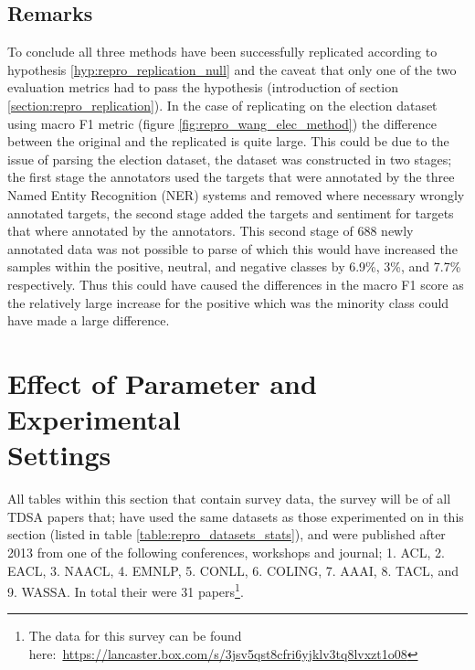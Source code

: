\subsection{Remarks}
To conclude all three methods have been successfully replicated according to hypothesis \ref{hyp:repro_replication_null} and the caveat that only one of the two evaluation metrics had to pass the hypothesis (introduction of section \ref{section:repro_replication}). In the case of replicating \citet{repro_wang_2017} on the election dataset using macro F1 metric (figure \ref{fig:repro_wang_elec_method}) the difference between the original and the replicated is quite large. This could be due to the issue of parsing the election dataset, the dataset was constructed in two stages; the first stage the annotators used the targets that were annotated by the three Named Entity Recognition (NER) systems and removed where necessary wrongly annotated targets, the second stage added the targets and sentiment for targets that where annotated by the annotators. This second stage of 688 newly annotated data was not possible to parse of which this would have increased the samples within the positive, neutral, and negative classes by 6.9\%, 3\%, and 7.7\% respectively. Thus this could have caused the differences in the macro F1 score as the relatively large increase for the positive which was the minority class could have made a large difference.



\section{Effect of Parameter and Experimental \\Settings}
\label{section:repro_effect_param_settings}
All tables within this section that contain survey data, the survey will be of all TDSA papers that; have used the same datasets as those experimented on in this section (listed in table \ref{table:repro_datasets_stats}), and were published after 2013 from one of the following conferences, workshops and journal; 1. ACL, 2. EACL, 3. NAACL, 4. EMNLP, 5. CONLL, 6. COLING, 7. AAAI, 8. TACL, and 9. WASSA. In total their were 31 papers\footnote{The data for this survey can be found here:~\url{https://lancaster.box.com/s/3jsv5qst8cfri6yjklv3tq8lvxzt1o08}}.\\

